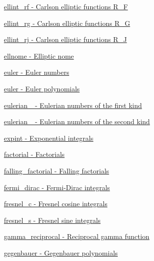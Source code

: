 \begin{DoxyItemize}
\item \hyperlink{group__gnu__math__spec__func_gae4859494464c7eaf98193f92b2235bc1}{ellint\+\_\+rf -\/ Carlson elliptic functions R\+\_\+F}
\item \hyperlink{group__gnu__math__spec__func_gadf618529d6106c1c1bc1e9212c4fed12}{ellint\+\_\+rg -\/ Carlson elliptic functions R\+\_\+G}
\item \hyperlink{group__gnu__math__spec__func_gadccabc8df929cc03745286ed1574a3ba}{ellint\+\_\+rj -\/ Carlson elliptic functions R\+\_\+J}
\item \hyperlink{group__gnu__math__spec__func_ga7bfb34f8b5c0ed7c72040f9cb7034bba}{ellnome -\/ Elliptic nome}
\item \hyperlink{group__gnu__math__spec__func_gac956e6457ab7d0d1765d281e73073f55}{euler -\/ Euler numbers}
\item \hyperlink{group__gnu__math__spec__func_gac956e6457ab7d0d1765d281e73073f55}{euler -\/ Euler polynomials}
\item \hyperlink{group__gnu__math__spec__func_gadfd8810a97655d2cdd1b0e3af68a79d3}{eulerian\+\_ -\/ Eulerian numbers of the first kind}
\item \hyperlink{group__gnu__math__spec__func_ga9bc456941d5e35cf54ec9c50f2e52884}{eulerian\+\_ -\/ Eulerian numbers of the second kind}
\item \hyperlink{group__gnu__math__spec__func_gadaf9317953b826975da72d1858f01ea5}{expint -\/ Exponential integrals}
\item \hyperlink{group__gnu__math__spec__func_ga963b1612f50b0964f5f42c9f289aab68}{factorial -\/ Factorials}
\item \hyperlink{group__gnu__math__spec__func_ga3cc8eb6068c7155ec48b40e20160c5c0}{falling\+\_\+factorial -\/ Falling factorials}
\item \hyperlink{group__gnu__math__spec__func_ga5468fbaed5cb8384cff7cfb9d2188d1a}{fermi\+\_\+dirac -\/ Fermi-\/\+Dirac integrals}
\item \hyperlink{group__gnu__math__spec__func_ga92a3585165bfad3f9972fb4210140d22}{fresnel\+\_\+c -\/ Fresnel cosine integrals}
\item \hyperlink{group__gnu__math__spec__func_ga075a32b4f59a5fa67c2e28232c89ad45}{fresnel\+\_\+s -\/ Fresnel sine integrals}
\item \hyperlink{group__gnu__math__spec__func_ga641f9bcdb8fc32a9a0ce7a15b5040076}{gamma\+\_\+reciprocal -\/ Reciprocal gamma function}
\item \hyperlink{group__gnu__math__spec__func_ga512e7981e328d6184f604de1892048b6}{gegenbauer -\/ Gegenbauer polynomials}

\end{DoxyItemize}
